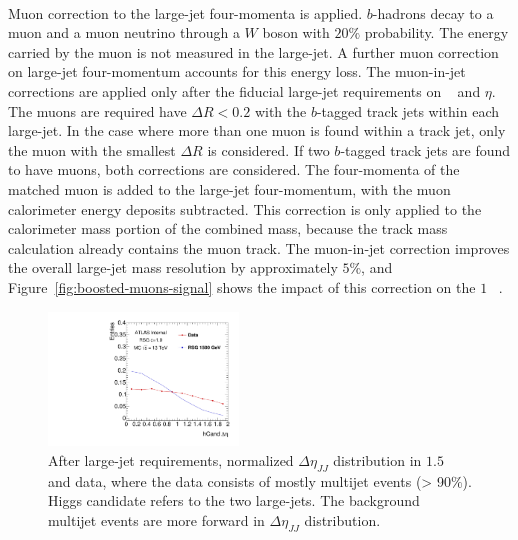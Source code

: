 \paragraph{}
Muon correction to the large-\R jet four-momenta is applied.
$b$-hadrons decay to a muon and a muon neutrino through a $W$ boson with $20\%$ probability.
The energy carried by the muon is not measured in the large-\R jet.
A further muon correction on large-\R jet four-momentum accounts for this energy loss.
The muon-in-jet corrections are applied only after the fiducial large-\R jet requirements on \pt~ and $\eta$.
The muons are required have $\Delta R < 0.2$ with the $b$-tagged track jets within each large-\R jet. 
In the case where more than one muon is found within a track jet, only the muon with the smallest $\Delta R$ is considered. 
If two $b$-tagged track jets are found to have muons, both corrections are considered. 
The four-momenta of the matched muon is added to the large-\R jet four-momentum, with the muon calorimeter energy deposits subtracted. 
This correction is only applied to the calorimeter mass portion of the combined mass, because the track mass calculation already contains the muon track. 
The muon-in-jet correction improves the overall large-\R jet mass resolution by approximately $5\%$, and Figure~\ref{fig:boosted-muons-signal} shows the impact of this correction on the $1$\TeV~ \Grav.

\begin{figure}
\begin{center}
  \includegraphics[width=0.45\textwidth,angle=-90]{figures/boosted/Other/AllTag_Signal_hCandDeta_F_c10-cb-no-deta-cut_truth_0.pdf}
  \caption{ After large-\R jet requirements, normalized $\Delta \eta_{JJ}$ distribution in $1.5$ \TeV \Grav~ and data, where the data consists of mostly multijet events (> 90$\%$). Higgs candidate refers to the two large-\R jets. The background multijet events are more forward in $\Delta \eta_{JJ}$ distribution.}
\label{fig:app-check-deta}
\end{center}
\end{figure}

